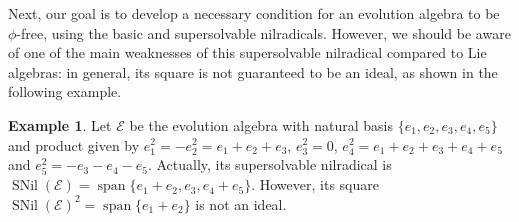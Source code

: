 \documentclass[12pt,reqno]{amsart}
\theoremstyle{definition}
\newtheorem{example}[theorem]{Example}
\theoremstyle{remark}
\DeclareMathOperator{\spa}{span}
\DeclareMathOperator{\snil}{SNil}
\numberwithin{equation}{section}
\begin{document}
Next, our goal is to develop a necessary condition for an evolution algebra to be $\phi$-free, using the basic and supersolvable nilradicals. However, we should be aware of one of the main weaknesses of this supersolvable nilradical compared to Lie algebras: in general, its square is not guaranteed to be an ideal, as shown in the following example.

\begin{example}
	Let $\mathcal{E}$ be the evolution algebra with natural basis $\{e_1,e_2,e_3,e_4,e_5\}$ and product given by $e_1^2=-e_2^2=e_1+e_2+e_3$, $e_3^2=0$, $e_4^2=e_1+e_2+e_3+e_4+e_5$ and $e_5^2=-e_3-e_4-e_5$. Actually, its supersolvable nilradical is $\snil(\mathcal{E})=\spa\{e_1+e_2,e_3,e_4+e_5\}$. However, its square $\snil(\mathcal{E})^2=\spa\{e_1+e_2\}$ is not an ideal.
\end{example}
\end{document}
